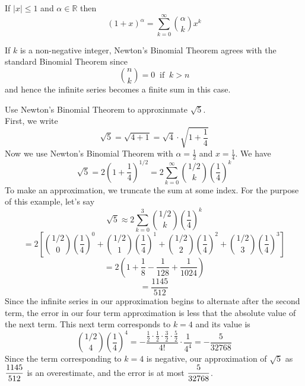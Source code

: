 \documentclass[handout]{ximera}
\begin{document}
\begin{theorem}
If $|x| \leq 1$ and $\alpha \in \mathbb{R}$ then
\[
(1+x)^\alpha = \sum_{k = 0}^\infty \binom{\alpha}{k}x^k
\]
\end{theorem}

\begin{remark} If $k$ is a non-negative integer, Newton's Binomial Theorem agrees with the standard Binomial Theorem since 
\[
\binom{n}{k} = 0 \;\; \text{if} \;\; k > n
\]
and hence the infinite series becomes a finite sum in this case.
\end{remark}


\begin{example}
Use Newton's Binomial Theorem to approxinmate $\sqrt 5$.\\
First, we write 
\[
\sqrt 5 = \sqrt{4+1} = \sqrt{4}\cdot \sqrt{1+\frac{1}{4}}
\]
Now we use Newton's Binomial Theorem with $\alpha = \frac12$ and $x = \frac14$.
We have
\[
\sqrt 5 = 2\left(1+\frac14\right)^{1/2} = 2\sum_{k=0}^\infty \binom{1/2}{k} \left(\frac14\right)^k
\]
To make an approximation, we truncate the sum at some index.  For the purpose of this example, let's say
\[
\sqrt 5 \approx 2\sum_{k=0}^3 \binom{1/2}{k} \left(\frac14\right)^k 
\]
\[
= 2\left[\binom{1/2}{0} \left(\frac14\right)^0 +\binom{1/2}{1} \left(\frac14\right)^1 + \binom{1/2}{2} \left(\frac14\right)^2 + \binom{1/2}{3} \left(\frac14\right)^3 \right]
\]
\[
= 2\left(1 + \frac18 - \frac{1}{128} + \frac{1}{1024}\right)
\]
\[
= \frac{1145}{512}
\]
Since the infinite series in our approximation begins to alternate after the second term, the error in our four term approximation is less that the absolute value of the next term. This next term corresponds to $k= 4$ and its value is 
\[
\binom{1/2}{4}\left(\frac14\right)^4 = -\frac{\frac12\cdot \frac12\cdot \frac32 \cdot\frac52}{4!}\cdot \frac{1}{4^4}
 = -\frac{5}{32768}
\]
Since the term corresponding to $k = 4$ is negative, our approximation of $\sqrt 5$ as $\displaystyle \frac{1145}{512}$ is an overestimate, and the error is at most $\displaystyle \frac{5}{32768}$.
\end{example}
\end{document}
